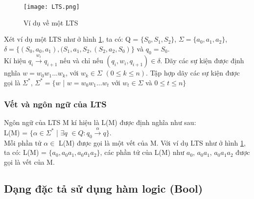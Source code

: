 \documentclass{article}
\begin{document}
\begin{flushleft}
				\begin{figure}[h]
					\centering
					\texttt{[image: LTS.png]}
					\caption{Ví dụ về một LTS}
					\label{fig:LTS}
				\end{figure}
				
				Xét ví dụ một LTS như ở hình \ref{fig:LTS}, ta có: Q = $\{S_0, S_1, S_2\}$, $\Sigma = \{a_0, a_1, a_2\}$, $\delta = \{(S_0, a_0, a_1), (S_1, a_1, S_2, (S_2, a_2, S_0)\}$ và $q_{0} = S_0$.\\
							
				Kí hiệu $q_i \overset{w_i}{\rightarrow} q_{i+1}$ nếu và chỉ nếu $(q_i, w_i, q_{i+1}) \in \delta$.
				Dãy các sự kiện được định nghĩa $w = w_0w_1...w_k$, với $w_k \in \Sigma$ $(0 \leq k \leq n)$. Tập hợp dãy các sự kiện được gọi là $\Sigma^*$, $\Sigma^* = \{w$ | $w = w_0w_1...w_t$ với $w_t \in \Sigma$ và $0 \leq t \leq n \}$
			\subsubsection{Vết và ngôn ngữ của LTS}	
				Ngôn ngữ của LTS M kí hiệu là L(M) được định nghĩa như sau:\\
				L(M) = $\{\alpha \in \Sigma^* $ | $\exists q$ $\in Q: q_0\overset{\alpha}{\rightarrow} q\}$.\\
				Mỗi phần tử $\alpha \in$ L(M) được gọi là một vết của M.
				Với ví dụ LTS như ở hình \ref{fig:LTS}, ta có: L(M) = $\{a_0, a_0a_1, a_0a_1a_2\}$, các phần tử của L(M) như $a_0$, $a_0a_1$, $a_0a_1a_2$ được gọi là vết của M.
			\subsection{Dạng đặc tả sử dụng hàm logic (Bool)}

\end{flushleft}
\end{document}
